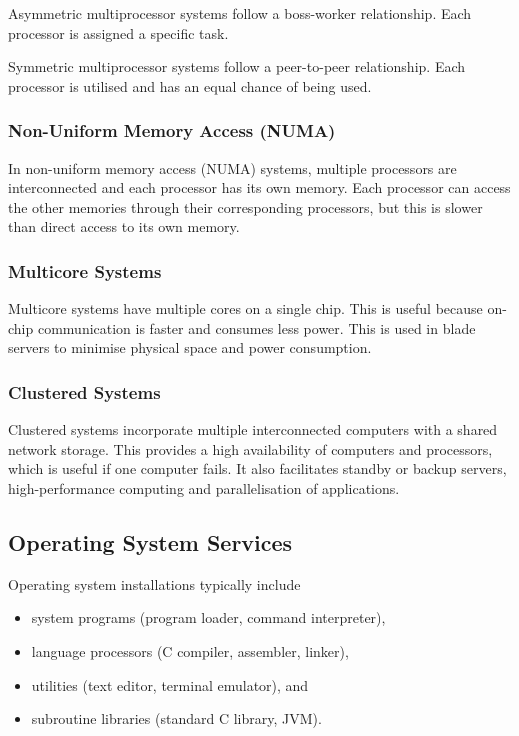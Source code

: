 Asymmetric multiprocessor systems follow a boss-worker relationship.
Each processor is assigned a specific task.

Symmetric multiprocessor systems follow a peer-to-peer relationship.
Each processor is utilised and has an equal chance of being used.
{\color{gray}
\subsubsection{Non-Uniform Memory Access (NUMA)}
In non-uniform memory access (NUMA) systems, multiple processors are interconnected and each processor has its own memory.
Each processor can access the other memories through their corresponding processors, but this is slower than direct access to its own memory.
\subsubsection{Multicore Systems}
Multicore systems have multiple cores on a single chip.
This is useful because on-chip communication is faster and consumes less power.
This is used in blade servers to minimise physical space and power consumption.
\subsubsection{Clustered Systems}
Clustered systems incorporate multiple interconnected computers with a shared network storage.
This provides a high availability of computers and processors, which is useful if one computer fails.
It also facilitates standby or backup servers, high-performance computing and parallelisation of applications.
}
\subsection{Operating System Services}
Operating system installations typically include
\begin{itemize}
  \item system programs (program loader, command interpreter),
  \item language processors (C compiler, assembler, linker),
  \item utilities (text editor, terminal emulator), and
  \item subroutine libraries (standard C library, JVM).
\end{itemize}

